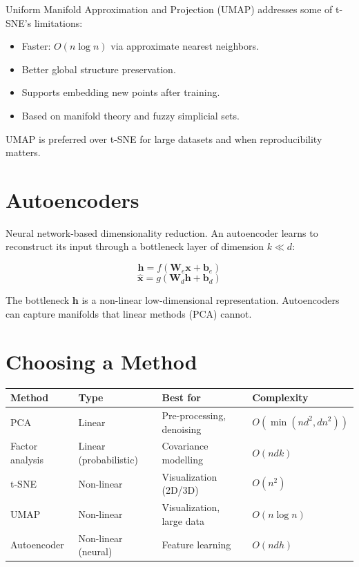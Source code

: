 Uniform Manifold Approximation and Projection (UMAP) addresses some of t-SNE's limitations:

\begin{itemize}
	\item Faster: $O(n \log n)$ via approximate nearest neighbors.
	\item Better global structure preservation.
	\item Supports embedding new points after training.
	\item Based on manifold theory and fuzzy simplicial sets.
\end{itemize}

UMAP is preferred over t-SNE for large datasets and when reproducibility matters.

\section{Autoencoders}

Neural network-based dimensionality reduction. An autoencoder learns to reconstruct its input through a bottleneck layer of dimension $k \ll d$:

\[
	\mathbf{h} = f(\mathbf{W}_e \mathbf{x} + \mathbf{b}_e)
\]
\[
	\hat{\mathbf{x}} = g(\mathbf{W}_d \mathbf{h} + \mathbf{b}_d)
\]

The bottleneck $\mathbf{h}$ is a non-linear low-dimensional representation. Autoencoders can capture manifolds that linear methods (PCA) cannot.

\section{Choosing a Method}

\begin{longtable}{p{2.5cm}p{4cm}p{4.5cm}p{3cm}}
	\toprule
	\textbf{Method} & \textbf{Type}          & \textbf{Best for}         & \textbf{Complexity}   \\
	\midrule
	PCA             & Linear                 & Pre-processing, denoising & $O(\min(nd^2, dn^2))$ \\
	Factor analysis & Linear (probabilistic) & Covariance modelling      & $O(ndk)$              \\
	t-SNE           & Non-linear             & Visualization (2D/3D)     & $O(n^2)$              \\
	UMAP            & Non-linear             & Visualization, large data & $O(n \log n)$         \\
	Autoencoder     & Non-linear (neural)    & Feature learning          & $O(n d h)$            \\
	\bottomrule
\end{longtable}

